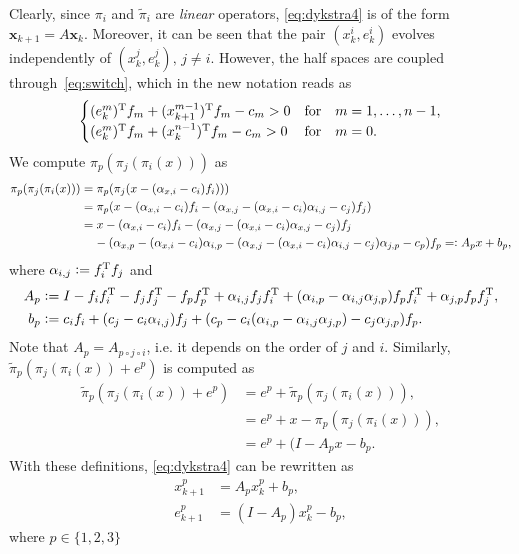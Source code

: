 \documentclass[hidelinks]{article}
\begin{document}
Clearly, since $\pi_i$ and $\tilde{\pi}_i$ are \textit{linear} operators, \eqref{eq:dykstra4} is of the form $\mathbf{x}_{k+1} = A\mathbf{x}_{k}$. Moreover, it can be seen that the pair $(x_k^i, e_k^i)$ evolves independently of  $(x_k^j, e_k^j),\,j\neq i$. However, the half spaces are coupled through~\eqref{eq:switch}, which in the new notation reads as
\begin{align}\label{eq:switch2}
\begin{cases}
(e_k^{m})^{\text{T}} f_{m}+(x_{k+1}^{m-1})^{\text{T}} f_{m}-c_{m} > 0 & \text{for}\quad m=1,\dots,n-1,\\
(e_k^{m})^{\text{T}} f_{m}+(x_{k}^{n-1})^{\text{T}} f_{m}-c_{m} > 0 & \text{for}\quad m=0.\\
\end{cases}
\end{align}
We compute $\pi_p(\pi_j(\pi_i(x)))$ as
\begin{equation}
\begin{aligned}
\pi_p(\pi_j(\pi_i(x))) 
&= \pi_p(\pi_j(x-(\alpha_{x,i} - c_i)f_i)))\\
&= \pi_p(x-(\alpha_{x,i}-c_i)f_i-(\alpha_{x,j} - (\alpha_{x,i}-c_i)\alpha_{i,j} -c_j)f_j)\\
&= x-(\alpha_{x,i}-c_i)f_i-(\alpha_{x,j} - (\alpha_{x,i}-c_i)\alpha_{x,j} -c_j)f_j\\
&\phantom{=}\,\,-(\alpha_{x,p}-(\alpha_{x,i}-c_i)\alpha_{i,p}-(\alpha_{x,j} - (\alpha_{x,i}-c_i)\alpha_{i,j} -c_j)\alpha_{j,p} -c_p)f_p=\vcentcolon A_px+b_p,
\end{aligned}
\end{equation}
where $\alpha_{i,j}\vcentcolon= f_i^{\text{T}} f_j$ and
\begin{subequations}
\begin{align}
A_p&\vcentcolon= I-f_i f_i^{\text{T}}-f_j f_j^{\text{T}}-f_p f_p^{\text{T}}+\alpha_{i,j}f_j f_i^{\text{T}}+(\alpha_{i,p} -\alpha_{i,j}\alpha_{j,p})f_p f_i^{\text{T}}+\alpha_{j,p}f_pf_j^{\text{T}},\\
b_p&\vcentcolon= c_i f_i+(c_j-c_i\alpha_{i,j})f_j+(c_p-c_i(\alpha_{i,p}-\alpha_{i,j}\alpha_{j,p})-c_j\alpha_{j,p})f_p.
\end{align}
\end{subequations}
Note that $A_p=A_{p\circ j\circ i}$, i.e. it depends on the order of $j$ and $i$. Similarly, $\tilde{\pi}_p(\pi_j(\pi_i(x))+e^p)$ is computed as
\begin{equation}
\begin{aligned}
\tilde{\pi}_p(\pi_j(\pi_i(x))+e^p)
&=e^p+\tilde{\pi}_p(\pi_j(\pi_i(x))),\\
&=e^p+x-\pi_p(\pi_j(\pi_i(x))),\\
&=e^p+(I-A_px-b_p.
\end{aligned}
\end{equation}
With these definitions, \eqref{eq:dykstra4} can be rewritten as
\begin{subequations}
\begin{align}
x_{k+1}^p&=A_p x_k^p +b_p,\\
e_{k+1}^p&=(I-A_p) x_k^p -b_p,
\end{align}
\end{subequations}
where $p\in\lbrace 1,2,3\rbrace$
\end{document}
